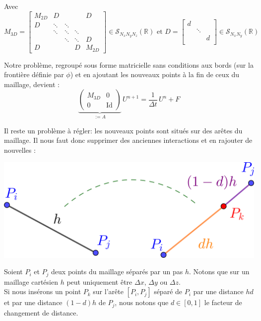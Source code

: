 \documentclass[11pt,a4paper]{article}
\begin{document}
Avec
\begin{equation*}
M_{3D} = 
\begin{bmatrix}
M_{2D} &D & & &D \\
D &\ddots &\ddots & & \\
 &\ddots &\ddots &\ddots &  \\
& &\ddots &\ddots  &D\\
D & & &D &M_{2D}
\end{bmatrix}\in\mathcal{S}_{N_xN_yN_z}\left(\mathbb{R}\right)\text{ et }
D = 
\begin{bmatrix}
d & & \\
 &\ddots & \\
 & &d \\
\end{bmatrix}\in\mathcal{S}_{N_xN_y}\left(\mathbb{R}\right)
\end{equation*}

Notre problème, regroupé sous forme matricielle sans conditions aux bords (sur la frontière définie par $\phi$) et en ajoutant les nouveaux points à la fin de ceux du maillage, devient :
\begin{equation*}
\underbrace{\left(
\begin{array}{c|c}
M_{3D} & 0\\
\hline
0 &\text{Id}
\end{array}\right)}_{:=A}\, U^{n+1} = \frac{1}{\Delta t}\,U^n + F
\end{equation*}

Il reste un problème à régler: les nouveaux points sont situés sur des arêtes du maillage. Il nous faut donc supprimer des anciennes interactions et en rajouter de nouvelles :
\begin{center}
\includegraphics[scale=0.3]{changement.png}
\end{center}
Soient $P_i$ et $P_j$ deux points du maillage séparés par un pas $h$. Notons que sur un maillage cartésien $h$ peut uniquement être $\Delta x$, $\Delta y$ ou $\Delta z$.\\
Si nous insérons un point $P_k$ sur l'arête $[P_i, P_j]$ séparé de $P_i$ par une distance $hd$ et par une distance $(1-d)h$ de $P_j$, nous notons que $d\in[0,1]$ le facteur de changement de distance.\\
\end{document}
